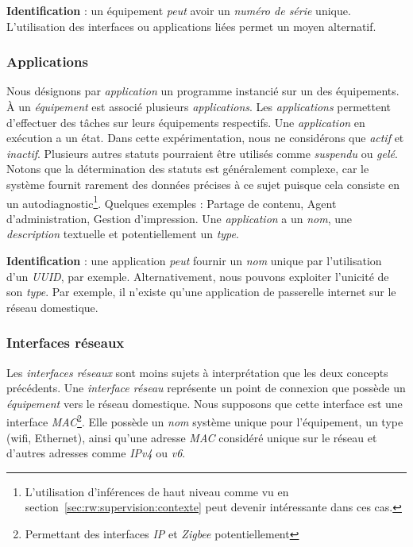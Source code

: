 \textbf{Identification} : un équipement \textit{peut} avoir un \textit{numéro de série} unique. L'utilisation des interfaces ou applications liées permet un moyen alternatif.

\subsubsection{Applications}
Nous désignons par \textit{application} un programme instancié sur un des équipements. À un \textit{équipement} est associé plusieurs \textit{applications}. Les \textit{applications} permettent d'effectuer des tâches sur leurs équipements respectifs. Une \textit{application} en exécution a un état. Dans cette expérimentation, nous ne considérons que \textit{actif} et \textit{inactif}. Plusieurs autres statuts pourraient être utilisés comme \textit{suspendu} ou \textit{gelé}. Notons que la détermination des statuts est généralement complexe, car le système fournit rarement des données précises à ce sujet puisque cela consiste en un autodiagnostic\footnote{L'utilisation d'inférences de haut niveau comme vu en section~\ref{sec:rw:supervision:contexte} peut devenir intéressante dans ces cas.}. Quelques exemples : Partage de contenu, Agent d'administration, Gestion d'impression. Une \textit{application} a un \textit{nom}, une \textit{description} textuelle et potentiellement un \textit{type}.

\textbf{Identification} : une application \textit{peut} fournir un \textit{nom} unique par l'utilisation d'un \textit{UUID}, par exemple. Alternativement, nous pouvons exploiter l'unicité de son \textit{type}. Par exemple, il n'existe qu'une application de passerelle internet sur le réseau domestique.

\subsubsection{Interfaces réseaux}
Les \textit{interfaces réseaux} sont moins sujets à interprétation que les deux concepts précédents. Une \textit{interface réseau} représente un point de connexion que possède un \textit{équipement} vers le réseau domestique. Nous supposons que cette interface est une interface \textit{MAC}\footnote{Permettant des interfaces \textit{IP} et \textit{Zigbee} potentiellement}. Elle possède un \textit{nom} système unique pour l'équipement, un type (wifi, Ethernet), ainsi qu'une adresse \textit{MAC} considéré unique sur le réseau et d'autres adresses comme \textit{IPv4} ou \textit{v6}.

